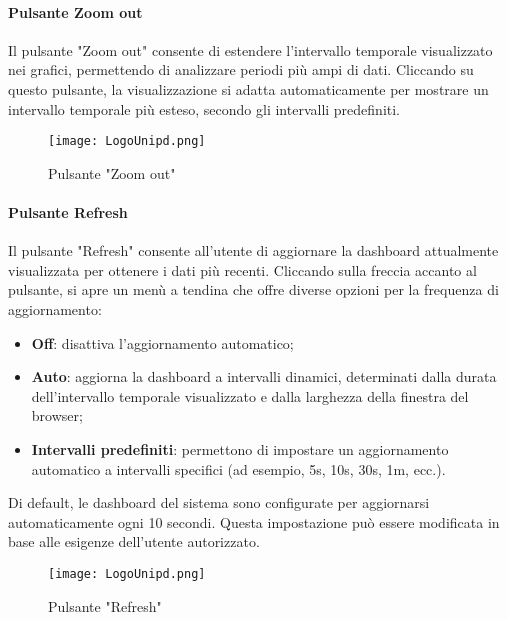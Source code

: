 \documentclass[10pt]{article}
\begin{document}
\begin{justify}
    \paragraph{Pulsante Zoom out}
    Il pulsante "Zoom out" consente di estendere l'intervallo temporale visualizzato nei grafici, permettendo di analizzare periodi più ampi di dati. Cliccando su questo pulsante, la visualizzazione si adatta automaticamente per mostrare un intervallo temporale più esteso, secondo gli intervalli predefiniti.
    \begin{figure}[H]
    \centering
    \texttt{[image: LogoUnipd.png]}
    \caption{Pulsante "Zoom out"}
    \end{figure}
    
    \paragraph{Pulsante Refresh}
    Il pulsante "Refresh" consente all'utente di aggiornare la dashboard attualmente visualizzata per ottenere i dati più recenti. Cliccando sulla freccia accanto al pulsante, si apre un menù a tendina che offre diverse opzioni per la frequenza di aggiornamento:
    \begin{itemize}
        \item \textbf{Off}: disattiva l'aggiornamento automatico;
        \item \textbf{Auto}: aggiorna la dashboard a intervalli dinamici, determinati dalla durata dell'intervallo temporale visualizzato e dalla larghezza della finestra del browser;
        \item \textbf{Intervalli predefiniti}: permettono di impostare un aggiornamento automatico a intervalli specifici (ad esempio, 5s, 10s, 30s, 1m, ecc.).
    \end{itemize}
    Di default, le dashboard del sistema sono configurate per aggiornarsi automaticamente ogni 10 secondi. Questa impostazione può essere modificata in base alle esigenze dell'utente autorizzato.
    \begin{figure}[H]
    \centering
    \texttt{[image: LogoUnipd.png]}
    \caption{Pulsante "Refresh"}
    \end{figure}



\end{justify}
\end{document}
